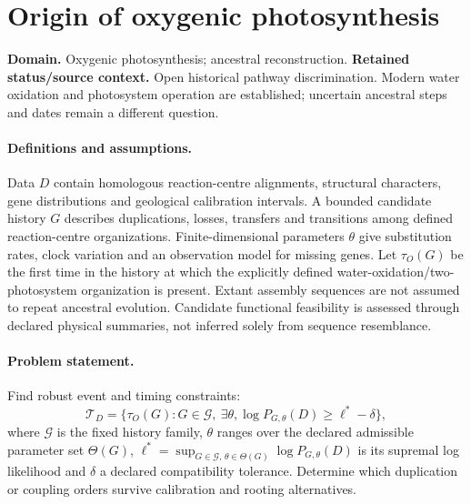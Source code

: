 \documentclass[11pt]{article}
\begin{document}
\section*{Origin of oxygenic photosynthesis}
\label{prob:326}
\label{rank:207}
\par\smallskip

\noindent\textbf{Domain.} Oxygenic photosynthesis; ancestral reconstruction. \quad \textbf{Retained status/source context.} Open historical pathway discrimination. Modern water oxidation and photosystem operation are established; uncertain ancestral steps and dates remain a different question.

\paragraph{Definitions and assumptions.} Data $D$ contain homologous reaction-centre alignments, structural characters, gene distributions and geological calibration intervals. A bounded candidate history $G$ describes duplications, losses, transfers and transitions among defined reaction-centre organizations. Finite-dimensional parameters $\theta$ give substitution rates, clock variation and an observation model for missing genes. Let $\tau_O(G)$ be the first time in the history at which the explicitly defined water-oxidation/two-photosystem organization is present. Extant assembly sequences are not assumed to repeat ancestral evolution. Candidate functional feasibility is assessed through declared physical summaries, not inferred solely from sequence resemblance.

\paragraph{Problem statement.} Find robust event and timing constraints:
    \[\mathcal T_D=\{\tau_O(G):G\in\mathcal G,\ \exists\theta,
    \log P_{G,\theta}(D)\geq\ell^*-\delta\},\]
    where $\mathcal G$ is the fixed history family, $\theta$ ranges over the declared admissible parameter set $\Theta(G)$, $\ell^*=\sup_{G\in\mathcal G,\,\theta\in\Theta(G)}\log P_{G,\theta}(D)$ is its supremal log likelihood and $\delta$ a declared compatibility tolerance. Determine which duplication or coupling orders survive calibration and rooting alternatives.
\end{document}
